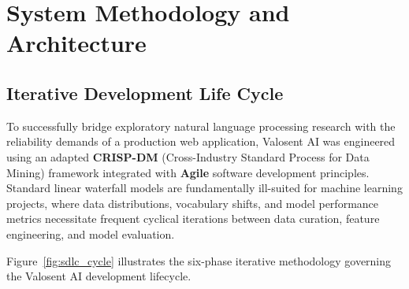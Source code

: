 \chapter{System Methodology and Architecture}
\label{chap:methodology_architecture}

\section{Iterative Development Life Cycle}
\label{sec:sdlc}

To successfully bridge exploratory natural language processing research with the reliability demands of a production web application, Valosent AI was engineered using an adapted \textbf{CRISP-DM} (Cross-Industry Standard Process for Data Mining) framework integrated with \textbf{Agile} software development principles. Standard linear waterfall models are fundamentally ill-suited for machine learning projects, where data distributions, vocabulary shifts, and model performance metrics necessitate frequent cyclical iterations between data curation, feature engineering, and model evaluation.

Figure~\ref{fig:sdlc_cycle} illustrates the six-phase iterative methodology governing the Valosent AI development lifecycle.

